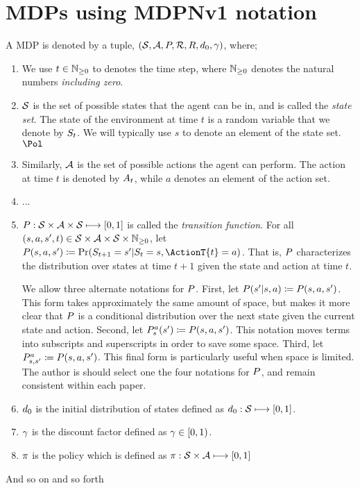 \documentclass[a4paper]{article}
\begin{document}
\section{MDPs using MDPNv1 notation}
\label{sec:mdps}
A \gls{MDP} is denoted by a tuple, $\MDP$, where;
%
\begin{enumerate}
    \item We use $\step$ to denotes the time step, where $\NZ$ denotes the natural numbers {\em including zero}.

    \item $\sset$ is the set of possible states that the agent can be in, and is called the {\em state set}. The state of the environment at time $t$ is a random variable that we denote by $\st{t}$. We will typically use $s$ to denote an element of the state set. $\Pol$

    \item Similarly, $\aset$ is the set of possible actions the agent can perform. The action at time $t$ is denoted by $\at{t}$, while $a$ denotes an element of the action set.

    \item ...

    \item $\Tdef$ is called the {\em transition function}. For all $(s,a,s',t) \in \sset \times \aset \times \sset \times \NZ$, let $\T(s,a,s')\coloneqq\Pr(\st{t+1}=s' | \st{t}=s, \ActionT{t}=a)$.
    That is, $\T$ characterizes the distribution over states at time $t+1$ given the state and action at time $t$.

    We allow three alternate notations for $\T$.
    First, let $\TransitionA{s}{a}{s'} \coloneqq \T(s,a,s')$.
    This form takes approximately the same amount of space, but makes it more clear that $\T$ is a conditional distribution over the next state given the current state and action.
    Second, let $\TransitionB{s}{a}{s'} \coloneqq \T(s,a,s')$.
    This notation moves terms into subscripts and superscripts in order to save some space.
    Third, let $\TransitionC{s}{a}{s'} \coloneqq \T(s,a,s')$.
    This final form is particularly useful when space is limited.
    The author is should select one the four notations for $\T$, and remain consistent within each paper.

    \item $\isset$ is the initial distribution of states defined as $\issetdef$.
    \item $\D$ is the discount factor defined as $\Ddef$.

    \item $\pol$ is the policy which is defined as $\poldef$

\end{enumerate}
%
And so on and so forth
\end{document}
